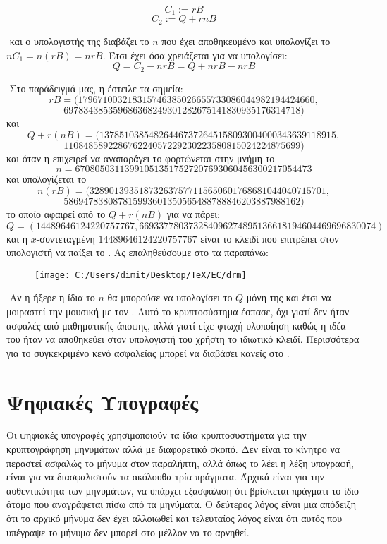 \documentclass[oneside,a4paper]{article}
\begin{document}
$$C_1:= r B$$
$$C_2 := Q + rnB$$

$ $\newline
και ο υπολογιστής της  διαβάζει το $n$ που έχει αποθηκευμένο και υπολογίζει το $n C_1 = n(rB) = nrB$. Έτσι έχει όσα χρειάζεται για να υπολογίσει:
$$Q = C_2 - nrB = Q + nrB - nrB$$

$ $\newline
Στο παράδειγμά μας, η  έστειλε τα σημεία:
$$rB = (179671003218315746385026655733086044982194424660,$$
$$697834385359686368249301282675141830935176314718)$$ και
$$Q + r(nB) = (137851038548264467372645158093004000343639118915,$$
$$110848589228676224057229230223580815024224875699)$$
και όταν η  επιχειρεί να αναπαράγει το  φορτώνεται στην μνήμη το 
$$n = 670805031139910513517527207693060456300217054473$$ και υπολογίζεται το
$$n(rB) = (328901393518732637577115650601768681044040715701,$$
$$586947838087815993601350565488788846203887988162)$$ το οποίο αφαιρεί από το $Q  +r(nB)$ για να πάρει:
$$Q = (14489646124220757767,
669337780373284096274895136618194604469696830074)$$
και η $x$-συντεταγμένη $14489646124220757767$ είναι το κλειδί που επιτρέπει στον υπολογιστή να παίξει το . Ας επαληθεύσουμε στο  τα παραπάνω:

\begin{figure}[H]
	\centering
	\texttt{[image: C:/Users/dimit/Desktop/TeX/EC/drm]}
\end{figure}

$ $\newline
Αν η  ήξερε η ίδια το $n$ θα μπορούσε να υπολογίσει το $Q$ μόνη της και έτσι να μοιραστεί την μουσική με τον . Αυτό το κρυπτοσύστημα έσπασε, όχι γιατί δεν ήταν ασφαλές από μαθηματικής άποψης, αλλά γιατί είχε φτωχή υλοποίηση καθώς η ιδέα του ήταν να αποθηκεύει στον υπολογιστή του χρήστη το ιδιωτικό κλειδί. Περισσότερα για το συγκεκριμένο κενό ασφαλείας μπορεί να διαβάσει κανείς στο .
\pagebreak

\section{Ψηφιακές Υπογραφές}

\vspace*{0.3cm}
\noindent Οι ψηφιακές υπογραφές χρησιμοποιούν τα ίδια κρυπτοσυστήματα για την κρυπτογράφηση μηνυμάτων αλλά με διαφορετικό σκοπό. Δεν είναι το κίνητρο να περαστεί ασφαλώς το μήνυμα στον παραλήπτη, αλλά όπως το λέει η λέξη υπογραφή, είναι για να διασφαλιστούν τα ακόλουθα τρία πράγματα. Άρχικά είναι για την αυθεντικότητα των μηνυμάτων, να υπάρχει εξασφάλιση ότι βρίσκεται πράγματι το ίδιο άτομο που αναγράφεται πίσω από τα μηνύματα. Ο δεύτερος λόγος είναι μια απόδειξη ότι το αρχικό μήνυμα δεν έχει αλλοιωθεί και τελευταίος λόγος είναι ότι αυτός που υπέγραψε το μήνυμα δεν μπορεί στο μέλλον να το αρνηθεί.
\end{document}
